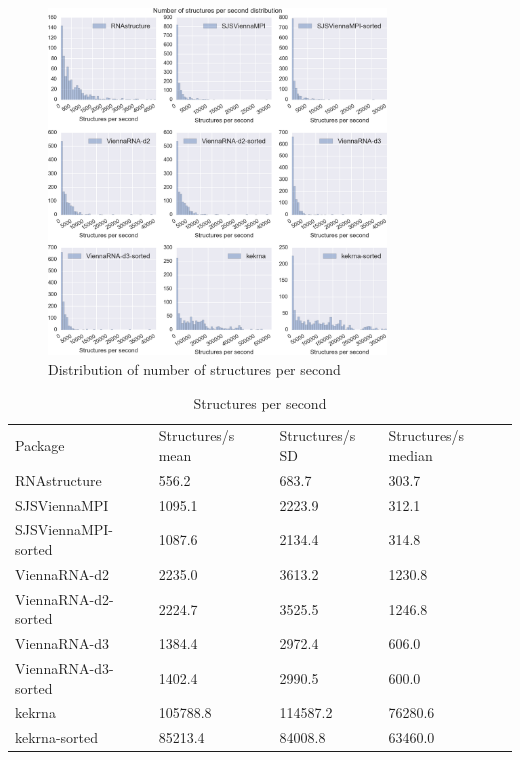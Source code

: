 \documentclass{cshonours}
\begin{document}
\begin{figure}[h]
\centering
\includegraphics[width=0.8\textwidth]{res/subopt_distribution_numstruc.png}
\caption{Distribution of number of structures per second}
\label{fig:subopt_distribution_numstruc}
\end{figure}

\begin{table}
\begin{adjustbox}{center}
\begin{tabular}{llll}
Package & Structures/s mean & Structures/s SD & Structures/s median \\
RNAstructure & 556.2 & 683.7 & 303.7 \\
SJSViennaMPI & 1095.1 & 2223.9 & 312.1 \\
SJSViennaMPI-sorted & 1087.6 & 2134.4 & 314.8 \\
ViennaRNA-d2 & 2235.0 & 3613.2 & 1230.8 \\
ViennaRNA-d2-sorted & 2224.7 & 3525.5 & 1246.8 \\
ViennaRNA-d3 & 1384.4 & 2972.4 & 606.0 \\
ViennaRNA-d3-sorted & 1402.4 & 2990.5 & 600.0 \\
kekrna & 105788.8 & 114587.2 & 76280.6 \\
kekrna-sorted & 85213.4 & 84008.8 & 63460.0 \\
\end{tabular}
\end{adjustbox}
\caption{Structures per second}
\label{table:structures_per_second}
\end{table}
\end{document}

